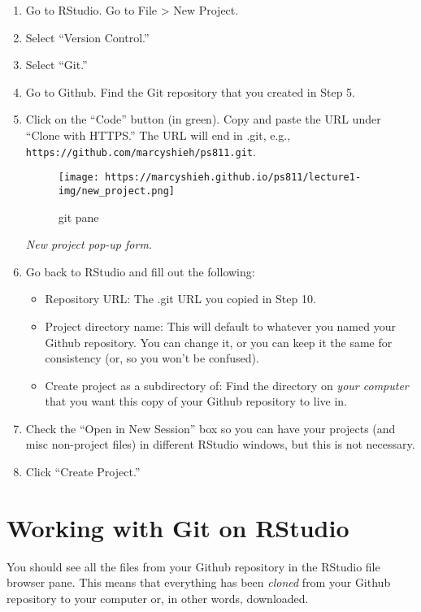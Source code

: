 \documentclass[
]{book}
\providecommand{\tightlist}{%
  \setlength{\itemsep}{0pt}\setlength{\parskip}{0pt}}
\begin{document}
\begin{enumerate}
\def\labelenumi{\arabic{enumi}.}
\setcounter{enumi}{5}
\item
  Go to RStudio. Go to File \textgreater{} New Project.
\item
  Select ``Version Control.''
\item
  Select ``Git.''
\item
  Go to Github. Find the Git repository that you created in Step 5.
\item
  Click on the ``Code'' button (in green). Copy and paste the URL under ``Clone with HTTPS.'' The URL will end in .git, e.g., \texttt{https://github.com/marcyshieh/ps811.git}.

  \begin{figure}
  \centering
  \texttt{[image: https://marcyshieh.github.io/ps811/lecture1-img/new\_project.png]}
  \caption{git pane}
  \end{figure}

  \emph{New project pop-up form.}
\item
  Go back to RStudio and fill out the following:

  \begin{itemize}
  \tightlist
  \item
    Repository URL: The .git URL you copied in Step 10.
  \item
    Project directory name: This will default to whatever you named your Github repository. You can change it, or you can keep it the same for consistency (or, so you won't be confused).
  \item
    Create project as a subdirectory of: Find the directory on \emph{your computer} that you want this copy of your Github repository to live in.
  \end{itemize}
\item
  Check the ``Open in New Session'' box so you can have your projects (and misc non-project files) in different RStudio windows, but this is not necessary.
\item
  Click ``Create Project.''
\end{enumerate}

\hypertarget{work-git}{%
\section{Working with Git on RStudio}\label{work-git}}

You should see all the files from your Github repository in the RStudio file browser pane. This means that everything has been \emph{cloned} from your Github repository to your computer or, in other words, downloaded.
\end{document}
